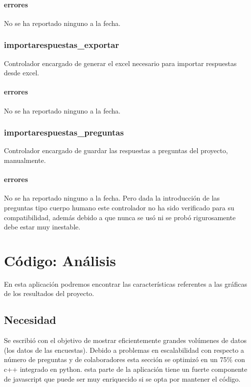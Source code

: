 \documentclass[10pt,a4paper]{book}
\begin{document}
	\subsubsection{errores}
	No se ha reportado ninguno a la fecha.

	\subsection{importarespuestas\_exportar}
	Controlador encargado de generar el excel necesario para importar respuestas desde excel.
	\subsubsection{errores}
	No se ha reportado ninguno a la fecha.

	\subsection{importarespuestas\_preguntas}
	Controlador encargado de guardar las respuestas a preguntas del proyecto, manualmente.
	\subsubsection{errores}
	No se ha reportado ninguno a la fecha. Pero dada la introducción de las preguntas tipo cuerpo humano este controlador no ha sido verificado para su compatibilidad, además debido a que nunca se usó ni se probó rigurosamente debe estar muy inestable.


	\chapter{Código: Análisis}

	En esta aplicación podremos encontrar las características referentes a las gráficas de los resultados del proyecto.

	\section{Necesidad}

	Se escribió con el objetivo de mostrar eficientemente grandes volúmenes de datos (los datos de las encuestas). Debido a problemas en escalabilidad con respecto a número de preguntas y de colaboradores esta sección se optimizó en un 75\% con c++ integrado en python. esta parte de la aplicación tiene un fuerte componente de javascript que puede ser muy enriquecido si se opta por mantener el código.
\end{document}

